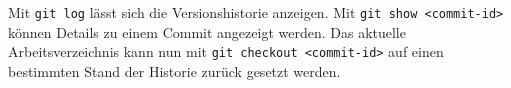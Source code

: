 Mit \lstinline|git log| lässt sich die Versionshistorie anzeigen. Mit \lstinline|git show <commit-id>| können Details zu einem Commit angezeigt werden. Das aktuelle Arbeitsverzeichnis kann nun mit \lstinline|git checkout <commit-id>| auf einen bestimmten Stand der Historie zurück gesetzt werden.
